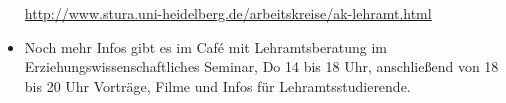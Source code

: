 \begin{itemize}
      \url{http://www.stura.uni-heidelberg.de/arbeitskreise/ak-lehramt.html}



\item Noch mehr Infos gibt es im Café mit Lehramtsberatung im
      Erziehungswissenschaftliches Seminar, Do 14 bis 18 Uhr,
      anschließend von 18 bis 20 Uhr Vorträge, Filme und Infos für
      Lehramtsstudierende.
\end{itemize}

\vfill
\begin{figure}[hbt]
\end{figure}

